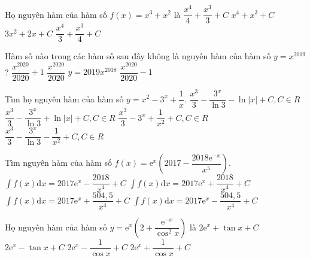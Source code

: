 \begin{ex}
	Họ nguyên hàm của hàm số $ f(x)=x^3+x^2$ là
	\choice
	{\True $\dfrac{x^4}{4}+\dfrac{x^3}{3}+C$}
	{$x^4+x^3+C$}
	{$ 3x^2+2x+C$}
	{$\dfrac{x^4}{3}+\dfrac{x^3}{4}+C$}
\end{ex}
\begin{ex}
	Hàm số nào trong các hàm số sau đây không là nguyên hàm của hàm số $ y=x^{2019}$?
	\choice
	{$\dfrac{x^{2020}}{2020}+1$}
	{$\dfrac{x^{2020}}{2020}$}
	{\True $ y=2019x^{2018}$}
	{$\dfrac{x^{2020}}{2020}-1$}
\end{ex}
\begin{ex}
	Tìm họ nguyên hàm của hàm số $ y=x^2-3^x+\dfrac{1}{x}$.
	\choice
	{$\dfrac{x^3}{3}-\dfrac{3^x}{\ln 3}-\ln\left| x\right|+C,C\in R$}
	{\True $\dfrac{x^3}{3}-\dfrac{3^x}{\ln 3}+\ln\left| x\right|+C,C\in R$}
	{$\dfrac{x^3}{3}-3^x+\dfrac{1}{x^2}+C,C\in R$}
	{$\dfrac{x^3}{3}-\dfrac{3^x}{\ln 3}-\dfrac{1}{x^2}+C,C\in R$}
\end{ex}
\begin{ex}
	Tìm nguyên hàm của hàm số $ f(x)=\mathrm{e}^x\left(2017-\dfrac{2018\mathrm{e}^{-x}}{x^5}\right)$.
	\choice
	{$\displaystyle\int{f(x)\mathrm{d}x}=2017\mathrm{e}^x-\dfrac{2018}{x^4}+C$}
	{$\displaystyle\int{f(x)\mathrm{d}x}=2017\mathrm{e}^x+\dfrac{2018}{x^4}+C$}
	{\True $\displaystyle\int{f(x)\mathrm{d}x}=2017\mathrm{e}^x+\dfrac{504,5}{x^4}+C$}
	{$\displaystyle\int{f(x)\mathrm{d}x}=2017\mathrm{e}^x-\dfrac{504,5}{x^4}+C$}
\end{ex}
\begin{ex}
	Họ nguyên hàm của hàm số $y=\mathrm{e}^x\left(2+\dfrac{\mathrm{e}^{-x}}{\cos^2x}\right)$ là
	\choice
	{\True $2\mathrm{e}^x+\tan x+C$}
	{$2\mathrm{e}^x-\tan x+C$}
	{$2\mathrm{e}^x-\dfrac{1}{\cos x}+C$}
	{$2\mathrm{e}^x+\dfrac{1}{\cos x}+C$}
\end{ex}

